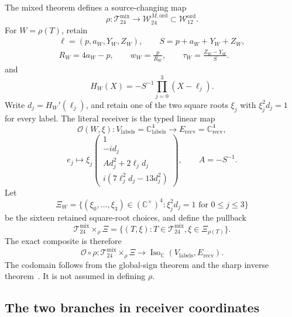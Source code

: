 The mixed theorem defines a source-changing map
\begin{equation}\label{eq:rho}
 \rho:\mathcal T_{24}^{\mathrm{mix}}
 \longrightarrow \mathcal W_{24}^{M,\mathrm{ord}}
 \subset\mathcal W_{12}^{\mathrm{ord}}.
\end{equation}
For \(W=\rho(T)\), retain
\[
 \begin{gathered}
 \ell=(p,a_W,Y_W,Z_W),\qquad S=p+a_W+Y_W+Z_W,\\
 R_W=4a_W-p,\qquad w_W=\frac p{R_W},\qquad
 \tau_W=\frac{Z_W-Y_W}{S}.
 \end{gathered}
\]
and
\[
 H_W(X)=-S^{-1}\prod_{j=0}^3(X-\ell_j).
\]
Write \(d_j=H_W'(\ell_j)\), and retain one of the two square roots
\(\xi_j\) with \(\xi_j^2d_j=1\) for every label.  The literal receiver is
the typed linear map
\begin{equation}\label{eq:receiver-typed}
 \mathscr O(W,\xi):V_{\mathrm{labels}}=\mathbb C^4_{\mathrm{labels}}
 \longrightarrow E_{\mathrm{recv}}=\mathbb C^4_{\mathrm{recv}},
\end{equation}
\[
 e_j\longmapsto
 \xi_j
 \begin{pmatrix}
 1\\-i d_j\\A d_j^2+2\ell_jd_j\\
 i(7\ell_j^2d_j-13d_j^2)
 \end{pmatrix},
 \qquad A=-S^{-1}.
\]
Let
\[
 \Xi_W=\{(\xi_0,\ldots,\xi_3)\in(\mathbb C^\times)^4:
          \xi_j^2d_j=1\text{ for }0\le j\le3\}
\]
be the sixteen retained square-root choices, and define the pullback
\[
 \mathcal T_{24}^{\mathrm{mix}}\times_\rho\Xi
 =\{(T,\xi):T\in\mathcal T_{24}^{\mathrm{mix}},
                 \xi\in\Xi_{\rho(T)}\}.
\]
The exact composite is therefore
\begin{equation}\label{eq:receiver-composite}
 \mathscr O\circ\rho:
 \mathcal T_{24}^{\mathrm{mix}}\times_\rho\Xi
 \longrightarrow
 \operatorname{Iso}_{\mathbb C}(V_{\mathrm{labels}},E_{\mathrm{recv}}).
\end{equation}
The codomain follows from the global-sign theorem and the sharp inverse
theorem~\cite{GlobalSign,SharpGrowth}.  It is not assumed in defining
\(\rho\).

\subsection{The two branches in receiver coordinates}

